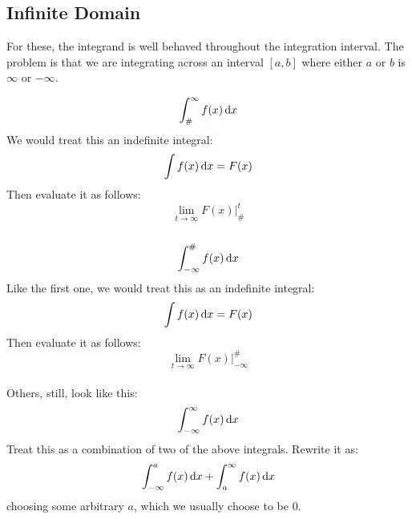 \subsection{Infinite Domain}

For these, the integrand is well behaved throughout the integration interval. The problem is that we are integrating across an interval $[a, b]$ where either $a$ or $b$ is $\infty$ or $-\infty$.

\begin{equation}
  \int^{\infty}_{\#} f(x) \,\mathrm{d} x
\end{equation}
We would treat this an indefinite integral:
\[ \int f(x) \,\mathrm{d} x = F(x) \]
Then evaluate it as follows:
\[ \lim_{t \to \infty} F(x)\bigg|^{t}_{\#} \] \\

\begin{equation}
  \int^{\#}_{-\infty} f(x) \,\mathrm{d} x
\end{equation}
Like the first one, we would treat this as an indefinite integral:
\[ \int f(x) \,\mathrm{d} x = F(x) \]
Then evaluate it as follows:
\[ \lim_{t \to \infty} F(x)\bigg|^{\#}_{-\infty} \] \\

Others, still, look like this:
\begin{equation}
  \int^{\infty}_{-\infty} f(x) \,\mathrm{d} x
\end{equation}
Treat this as a combination of two of the above integrals. Rewrite it as:
\[ \int^{a}_{-\infty} f(x) \,\mathrm{d} x
    + \int^{\infty}_{a} f(x) \,\mathrm{d} x \]
choosing some arbitrary \(a\), which we usually choose to be \(0\).

